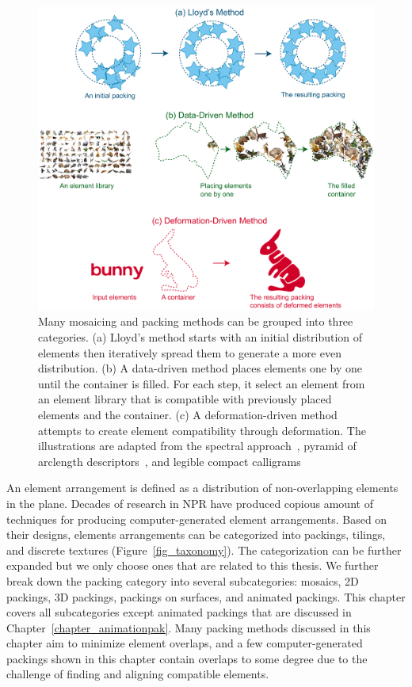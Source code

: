\begin{figure}
\centering
\includegraphics[width=1.0\textwidth]{figures/related/taxonomy_method.pdf} 
\caption[A classification of packing methods]
{\label{fig_taxonomy_method} 
\nnewtext
{
Many mosaicing and packing methods can be grouped into three categories. 
(a) Lloyd's method starts with an initial distribution of elements then iteratively spread them
to generate a more even distribution. 
(b) A data-driven method places elements one by one until the container is filled.
For each step, it select an element from an element library that is compatible with previously placed elements and the container.
(c) A deformation-driven method attempts to create element compatibility through deformation.
The illustrations are adapted from the spectral approach~\cite{Dalal2006}, 
pyramid of arclength descriptors~\cite{Kwan2016}, and
legible compact calligrams~\cite{Zou2016}
}
}
\end{figure}

\nnewtext
{
An element arrangement is defined as a distribution of non-overlapping elements in the plane.
Decades of research in NPR have produced copious amount of techniques for producing computer-generated element arrangements.
Based on their designs, elements arrangements can be categorized into 
packings, tilings, and discrete textures (Figure~\ref{fig_taxonomy}).
The categorization can be further expanded but we only choose ones that are related to this thesis.
We further break down the packing category into several subcategories: mosaics, 2D packings, 3D packings, 
packings on surfaces, and animated packings.
This chapter covers all subcategories except animated packings that are discussed in Chapter~\ref{chapter_animationpak}. 
Many packing methods discussed in this chapter aim to minimize element overlaps, and
a few computer-generated packings shown in this chapter 
contain overlaps to some degree due to the challenge of finding and aligning compatible elements.
}


